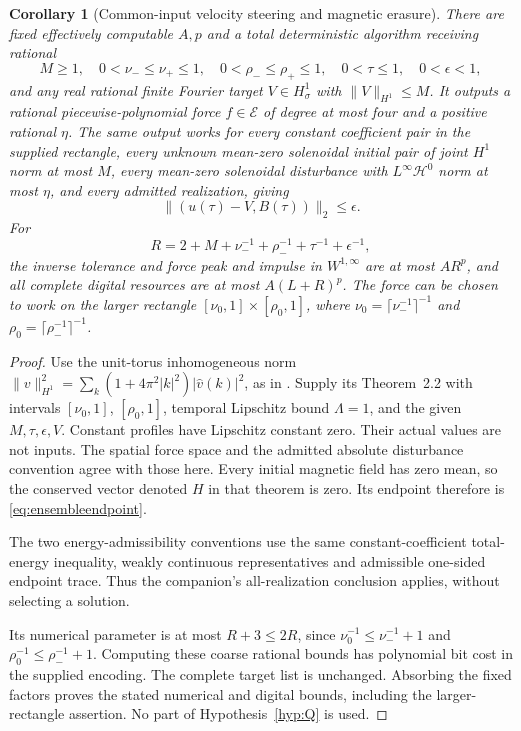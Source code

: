 \documentclass[11pt,a4paper]{amsart}
\newtheorem{corollary}[theorem]{Corollary}
\theoremstyle{definition}
\theoremstyle{remark}
\numberwithin{equation}{section}
\newcommand{\Hcal}{\mathcal H}
\newcommand{\norm}[1]{\lVert #1\rVert}
\begin{document}
\begin{corollary}[Common-input velocity steering and magnetic erasure]\label{thm:ensemble}
There are fixed effectively computable $A,p$ and a total deterministic algorithm receiving rational
\[
 M\ge1,\quad0<\nu_-\le\nu_+\le1,\quad
 0<\rho_-\le\rho_+\le1,\quad0<\tau\le1,\quad0<\epsilon<1,
\]
and any real rational finite Fourier target $V\in H^1_\sigma$ with $\norm V_{H^1}\le M$. It outputs a rational piecewise-polynomial force $f\in\mathcal E$ of degree at most four and a positive rational $\eta$. The same output works for every constant coefficient pair in the supplied rectangle, every unknown mean-zero solenoidal initial pair of joint $H^1$ norm at most $M$, every mean-zero solenoidal disturbance with $L^\infty\Hcal^0$ norm at most $\eta$, and every admitted realization, giving
\begin{equation}\label{eq:ensembleendpoint}
 \norm{(u(\tau)-V,B(\tau))}_2\le\epsilon.
\end{equation}
For
\[
 R=2+M+\nu_-^{-1}+\rho_-^{-1}+\tau^{-1}+\epsilon^{-1},
\]
the inverse tolerance and force peak and impulse in $W^{1,\infty}$ are at most $AR^p$, and all complete digital resources are at most $A(L+R)^p$. The force can be chosen to work on the larger rectangle $[\nu_0,1]\times[\rho_0,1]$, where
$\nu_0=\lceil\nu_-^{-1}\rceil^{-1}$ and
$\rho_0=\lceil\rho_-^{-1}\rceil^{-1}$.
\end{corollary}
\begin{proof}
Use the unit-torus inhomogeneous norm
$\norm v_{H^1}^2=\sum_k(1+4\pi^2|k|^2)|\widehat v(k)|^2$, as in \cite{CommonControl}. Supply its Theorem~2.2 with intervals $[\nu_0,1]$, $[\rho_0,1]$, temporal Lipschitz bound $\Lambda=1$, and the given $M,\tau,\epsilon,V$. Constant profiles have Lipschitz constant zero. Their actual values are not inputs. The spatial force space and the admitted absolute disturbance convention agree with those here. Every initial magnetic field has zero mean, so the conserved vector denoted $H$ in that theorem is zero. Its endpoint therefore is \eqref{eq:ensembleendpoint}.

The two energy-admissibility conventions use the same constant-coefficient total-energy inequality, weakly continuous representatives and admissible one-sided endpoint trace. Thus the companion's all-realization conclusion applies, without selecting a solution.

Its numerical parameter is at most $R+3\le2R$, since
$\nu_0^{-1}\le\nu_-^{-1}+1$ and
$\rho_0^{-1}\le\rho_-^{-1}+1$. Computing these coarse rational bounds has polynomial bit cost in the supplied encoding. The complete target list is unchanged. Absorbing the fixed factors proves the stated numerical and digital bounds, including the larger-rectangle assertion. No part of Hypothesis~\ref{hyp:Q} is used.
\end{proof}
\end{document}
